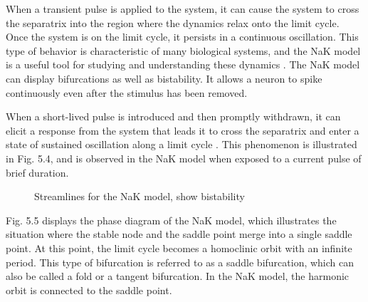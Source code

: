 \documentclass[12pt,a4paper]{report}
\begin{document}
When a transient pulse is applied to the system, it can cause the system to cross the separatrix into the region where the dynamics relax onto the limit cycle. Once the system is on the limit cycle, it persists in a continuous oscillation. This type of behavior is characteristic of many biological systems, and the NaK model is a useful tool for studying and understanding these dynamics \cite{ref9}. The NaK model can display bifurcations as well as bistability. It allows a neuron to spike continuously even after the stimulus has been removed. 

When a short-lived pulse is introduced and then promptly withdrawn, it can elicit a response from the system that leads it to cross the separatrix and enter a state of sustained oscillation along a limit cycle \cite{ref10}. This phenomenon is illustrated in Fig. 5.4, and is observed in the NaK model when exposed to a current pulse of brief duration.


\begin{figure}[H]
    \centering %
    \caption{Streamlines for the NaK model, show bistability\cite{ref9}} 
\end{figure}
    
    
Fig. 5.5 displays the phase diagram of the NaK model, which illustrates the situation where the stable node and the saddle point merge into a single saddle point. At this point, the limit cycle becomes a homoclinic orbit with an infinite period. This type of bifurcation is referred to as a saddle bifurcation, which can also be called a fold or a tangent bifurcation. In the NaK model, the harmonic orbit is connected to the saddle point.
    
\end{document}
